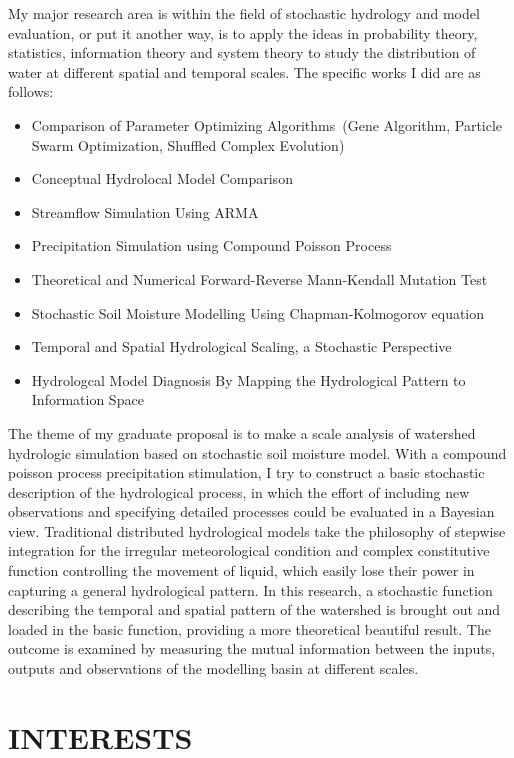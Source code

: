 \documentclass{res}
\begin{document}
\begin{resume}
My major research area is within the field of stochastic hydrology and model evaluation, or put it another way, is to apply the ideas in probability theory, statistics, information theory and system theory to study the distribution of water at different spatial and temporal scales.
The  specific works I did are as follows:
\begin{itemize}
\item Comparison of Parameter Optimizing Algorithms~(Gene Algorithm, Particle Swarm Optimization, Shuffled Complex Evolution)
\item Conceptual Hydrolocal Model Comparison
\item Streamflow Simulation Using ARMA
\item Precipitation Simulation using Compound Poisson Process 
\item Theoretical and Numerical Forward-Reverse Mann-Kendall Mutation Test
\item Stochastic Soil Moisture Modelling Using Chapman-Kolmogorov equation
\item Temporal and Spatial Hydrological Scaling, a Stochastic Perspective 
\item Hydrologcal Model Diagnosis By Mapping the Hydrological Pattern to Information Space
\end{itemize}          
The theme of my graduate proposal is to make a scale analysis of watershed hydrologic simulation based on stochastic soil moisture model. With a compound poisson process precipitation stimulation, I try to construct a basic stochastic description of the hydrological process, in which the effort of including new observations and specifying detailed processes could be evaluated in a Bayesian view. Traditional distributed hydrological models take the philosophy of stepwise integration for the irregular meteorological condition and complex constitutive function controlling the movement of liquid, which easily lose their power in capturing a general hydrological pattern. In this research, a stochastic function describing the temporal and spatial pattern of the watershed is brought out and loaded in the basic function, providing a more theoretical beautiful 
result. The outcome is examined by measuring the mutual information between the inputs, outputs and observations of the modelling basin at different scales.         
  
\section{INTERESTS}
 

\end{resume}
\end{document}
